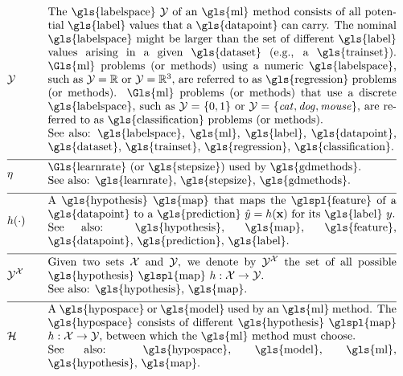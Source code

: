 \begin{align}
	&\labelspace  &\quad & \parbox{.90\textwidth}{The \gls{labelspace} $\labelspace$ of 
		an \gls{ml} method consists of all potential \gls{label} values that a \gls{datapoint} can 
		carry. The nominal \gls{labelspace} might be larger than the set of different \gls{label} 
		values arising in a given \gls{dataset} (e.g., a \gls{trainset}). \Gls{ml} problems 
		(or methods) using a numeric \gls{labelspace}, such as $\labelspace=\mathbb{R}$ 
		or $\labelspace=\mathbb{R}^{3}$, are referred to as \gls{regression} problems (or methods). \Gls{ml} 
		problems (or methods) that use a discrete \gls{labelspace}, such as $\labelspace=\{0,1\}$ or $\labelspace=\{\mbox{\emph{cat}},\mbox{\emph{dog}},\mbox{\emph{mouse}}\}$, 
		are referred to as \gls{classification} problems (or methods).
		\\ See also: \gls{labelspace}, \gls{ml}, \gls{label}, \gls{datapoint},  \gls{dataset}, \gls{trainset}, 
		\gls{regression}, \gls{classification}.}  \nonumber \\[2mm] \hline \nonumber\\[-5mm]
	&\lrate  &\quad & \parbox{.90\textwidth}{\Gls{learnrate} (or \gls{stepsize}) used by \gls{gdmethods}.
		\\ See also: \gls{learnrate}, \gls{stepsize}, \gls{gdmethods}. }  \nonumber \\[2mm] \hline \nonumber\\[-5mm]
	&\hypothesis(\cdot)  &\quad &\parbox{.90\textwidth}{A \gls{hypothesis} \gls{map} that maps the \glspl{feature} of a \gls{datapoint} 
		to a \gls{prediction} $\hat{\truelabel}=\hypothesis(\featurevec)$ for its \gls{label} $\truelabel$.
		\\ See also: \gls{hypothesis}, \gls{map}, \gls{feature}, \gls{datapoint}, \gls{prediction}, \gls{label}. }  	 \nonumber \\[2mm] \hline \nonumber\\[-5mm]
	 &\labelspace^{\featurespace} &\quad & \parbox{.90\textwidth}{Given two sets $\featurespace$ and $\labelspace$, we denote by $\labelspace^{\featurespace}$ 
	 	the set of all possible \gls{hypothesis} \glspl{map} $\hypothesis: \featurespace \rightarrow \labelspace$.
		\\ See also: \gls{hypothesis}, \gls{map}. } 	 \nonumber \\[2mm] \hline \nonumber\\[-5mm]
	&\hypospace  &\quad & \parbox{.90\textwidth}{A \gls{hypospace} or \gls{model} used by an \gls{ml} method. 
		The \gls{hypospace} consists of different \gls{hypothesis} \glspl{map} $\hypothesis: \featurespace \rightarrow \labelspace$, between which 
		the \gls{ml} method must choose.
		\\ See also: \gls{hypospace}, \gls{model}, \gls{ml}, \gls{hypothesis}, \gls{map}. }   \nonumber 
\end{align}     

